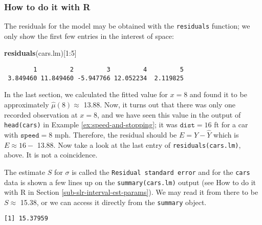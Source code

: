 \documentclass[]{book}
\newenvironment{Shaded}{\begin{snugshade}}{\end{snugshade}}
\newcommand{\KeywordTok}[1]{\textcolor[rgb]{0.13,0.29,0.53}{\textbf{{#1}}}}
\newcommand{\DecValTok}[1]{\textcolor[rgb]{0.00,0.00,0.81}{{#1}}}
\newcommand{\StringTok}[1]{\textcolor[rgb]{0.31,0.60,0.02}{{#1}}}
\newcommand{\NormalTok}[1]{{#1}}
\numberwithin{equation}{chapter}
\numberwithin{figure}{chapter}
\theoremstyle{plain}
\theoremstyle{definition}
\theoremstyle{remark}
\theoremstyle{definition}
\theoremstyle{definition}
\theoremstyle{remark}
\begin{document}
\subsubsection{How to do it with R}\label{how-to-do-it-with-r-49}

The residuals for the model may be obtained with the \texttt{residuals}
function; we only show the first few entries in the interest of space:

\begin{Shaded}
\begin{Highlighting}[]
\KeywordTok{residuals}\NormalTok{(cars.lm)[}\DecValTok{1}\NormalTok{:}\DecValTok{5}\NormalTok{]}
\end{Highlighting}
\end{Shaded}

\begin{verbatim}
        1         2         3         4         5 
 3.849460 11.849460 -5.947766 12.052234  2.119825 
\end{verbatim}

In the last section, we calculated the fitted value for \(x=8\) and
found it to be approximately \(\hat{\mu}(8) \approx\) 13.88. Now, it
turns out that there was only one recorded observation at \(x = 8\), and
we have seen this value in the output of \texttt{head(cars)} in Example
\ref{ex:speed-and-stopping}; it was \(\mathtt{dist} = 16\) ft for a car
with \(\mathtt{speed} = 8\) mph. Therefore, the residual should be
\(E = Y - \hat{Y}\) which is \(E \approx 16 -\) 13.88. Now take a look
at the last entry of \texttt{residuals(cars.lm)}, above. It is not a
coincidence.

The estimate \(S\) for \(\sigma\) is called the
\texttt{Residual\ standard\ error} and for the \texttt{cars} data is
shown a few lines up on the \texttt{summary(cars.lm)} output (see How to
do it with R in Section \ref{sub-slr-interval-est-params}). We may read
it from there to be \(S\approx\) 15.38, or we can access it directly
from the \texttt{summary} object.

\begin{Shaded}
\end{Shaded}

\begin{verbatim}
[1] 15.37959
\end{verbatim}
\end{document}
